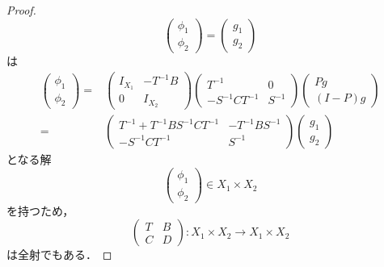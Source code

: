 \begin{proof}
\begin{equation*}
\begin{pmatrix}
      \phi_1 \\
      \phi_2
    \end{pmatrix}
    =
    \begin{pmatrix}
      g_1 \\
      g_2
    \end{pmatrix}
  \end{equation*}
  は
  \begin{equation*}
    \begin{split}
      \begin{pmatrix}
        \phi_1 \\
        \phi_2
      \end{pmatrix}
      =&
      \begin{pmatrix}
        I_{X_1} & -T^{-1}B \\
        0 & I_{X_2}
      \end{pmatrix}
      \begin{pmatrix}
        T^{-1} & 0 \\
        -S^{-1}CT^{-1} & S^{-1}
      \end{pmatrix}
      \begin{pmatrix}
        Pg \\
        (I-P)g
      \end{pmatrix}
      \\=&
      \begin{pmatrix}
        T^{-1}+T^{-1}BS^{-1}CT^{-1} & -T^{-1}BS^{-1} \\
        -S^{-1}CT^{-1} & S^{-1}
      \end{pmatrix}
      \begin{pmatrix}
        g_1 \\
        g_2
      \end{pmatrix}
    \end{split}
  \end{equation*}
  となる解
  \begin{equation*}
    \begin{pmatrix}
      \phi_1 \\
      \phi_2
    \end{pmatrix}
    \in X_1 \times X_2
  \end{equation*}
  を持つため，
  \begin{equation*}
    \begin{pmatrix}
      T & B \\
      C & D
    \end{pmatrix}
    : X_1 \times X_2 \rightarrow X_1 \times X_2
  \end{equation*}
  は全射でもある．


\end{proof}
